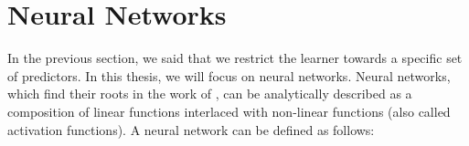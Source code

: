 






\newpage

\section{Neural Networks}
\label{subsection:ch2-neural_networks}


In the previous section, we said that we restrict the learner towards a specific set of predictors.
In this thesis, we will focus on neural networks. 
Neural networks, which find their roots in the work of \citet{mcculloch1943logical,rosenblatt1958perceptron}, can be analytically described as a composition of linear functions interlaced with non-linear functions (also called activation functions).
A neural network can be defined as follows:

